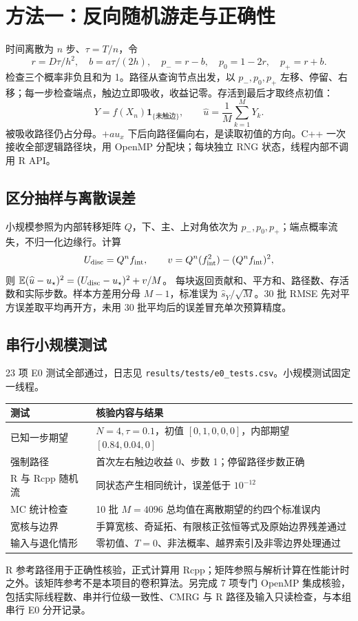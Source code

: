 \documentclass[UTF8,10.5pt,a4paper]{ctexart}
\begin{document}
\section{方法一：反向随机游走与正确性}
时间离散为 $n$ 步、$\tau=T/n$，令
\[
r=D\tau/h^2,\quad b=a\tau/(2h),\quad
p_-=r-b,\quad p_0=1-2r,\quad p_+=r+b.
\]
检查三个概率非负且和为 1。路径从查询节点出发，以 $p_-,p_0,p_+$ 左移、停留、右移；每一步检查端点，触边立即吸收，收益记零。存活到最后才取终点初值：
\[
Y=f(X_n)\mathbf1_{\{\text{未触边}\}},\qquad
\widehat u=\frac1M\sum_{k=1}^M Y_k.
\]
被吸收路径仍占分母。$+a u_x$ 下后向路径偏向右，是读取初值的方向。C++ 一次接收全部逻辑路径块，用 OpenMP 分配块；每块独立 RNG 状态，线程内部不调用 R API。
\subsection{区分抽样与离散误差}
小规模参照为内部转移矩阵 $Q$，下、主、上对角依次为 $p_-,p_0,p_+$；端点概率流失，不归一化边缘行。计算
\[
U_{\rm disc}=Q^nf_{\rm int},\qquad
v=Q^n(f_{\rm int}^2)-(Q^nf_{\rm int})^2,
\]
则 $\mathbb E(\widehat u-u_\star)^2=(U_{\rm disc}-u_\star)^2+v/M$。
每块返回贡献和、平方和、路径数、存活数和实际步数。样本方差用分母 $M-1$，标准误为 $\widehat s_Y/\sqrt M$。30 批 RMSE 先对平方误差取平均再开方，未用 30 批平均后的误差冒充单次预算精度。
\subsection{串行小规模测试}
23 项 E0 测试全部通过，日志见 \texttt{results/tests/e0\_tests.csv}。小规模测试固定一线程。
\begin{center}\small
\begin{tabular}{p{.27\linewidth}p{.61\linewidth}}\toprule
测试 & 核验内容与结果\\\midrule
已知一步期望 & $N=4,\tau=0.1$，初值 $[0,1,0,0,0]$，内部期望 $[0.84,0.04,0]$\\
强制路径 & 首次左右触边收益 0、步数 1；停留路径步数正确\\
R 与 Rcpp 随机流 & 同状态产生相同统计，误差低于 $10^{-12}$\\
MC 统计检查 & 10 批 $M=4096$ 总均值在离散期望的约四个标准误内\\
宽核与边界 & 手算宽核、奇延拓、有限核正弦恒等式及原始边界残差通过\\
输入与退化情形 & 零初值、$T=0$、非法概率、越界索引及非零边界处理通过\\\bottomrule
\end{tabular}
\end{center}
R 参考路径用于正确性核验，正式计算用 Rcpp；矩阵参照与解析计算在性能计时之外。该矩阵参考不是本项目的卷积算法。另完成 7 项专门 OpenMP 集成核验，包括实际线程数、串并行位级一致性、CMRG 与 R 路径及输入只读检查，与本组串行 E0 分开记录。
\newpage
\end{document}
